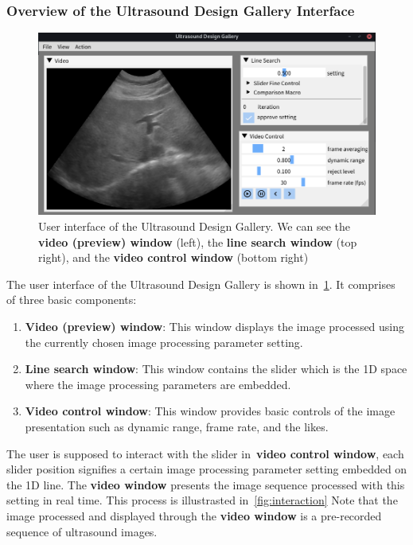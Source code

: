 \subsubsection{Overview of the Ultrasound Design Gallery Interface}
%
\begin{figure}[h]
  \centering
  \includegraphics[scale=0.30]{figures/ui.png}
  \caption{User interface of the Ultrasound Design Gallery. We can see the \textbf{video (preview) window} (left), the \textbf{line search window} (top right), and the \textbf{video control window} (bottom right) }\label{fig:ui}
\end{figure}
%
The user interface of the Ultrasound Design Gallery is shown in~\cref{fig:ui}.
It comprises of three basic components:
    \vspace{0.05in}
\begin{enumerate}
  \item[\ding{228}] \textbf{Video (preview) window}: This window displays the image processed using the currently chosen image processing parameter setting.
    \vspace{0.05in}
  \item[\ding{228}] \textbf{Line search window}: This window contains the slider which is the 1D space where the image processing parameters are embedded.
    \vspace{0.05in}
  \item[\ding{228}] \textbf{Video control window}: This window provides basic controls of the image presentation such as dynamic range, frame rate, and the likes.
\end{enumerate}
The user is supposed to interact with the slider in~\textbf{video control window}, each slider position signifies a certain image processing parameter setting embedded on the 1D line.
The \textbf{video window} presents the image sequence processed with this setting in real time.
This process is illustrasted in~\cref{fig:interaction}
Note that the image processed and displayed through the \textbf{video window} is a pre-recorded sequence of ultrasound images.

